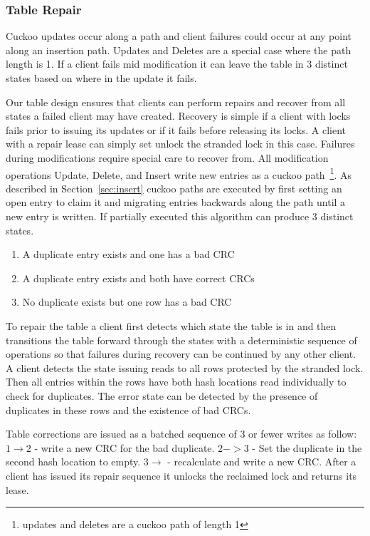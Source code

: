 \subsubsection{Table Repair} 
\label{sec:table-repair}

Cuckoo updates occur along a path
and client failures could occur at any point along an
insertion path. Updates and Deletes are a special case where
the path length is 1. If a client fails mid modification it
can leave the table in 3 distinct states based on where in
the update it fails. 

Our table design ensures that clients can perform repairs
and recover from all states a failed client may have
created. Recovery is simple if a client with locks fails
prior to issuing its updates or if it fails before releasing
its locks. A client with a repair lease can simply set
unlock the stranded lock in this case. Failures during
modifications require special care to recover from. All
modification operations Update, Delete, and Insert write new
entries as a cuckoo path~\footnote{updates and deletes are a
cuckoo path of length 1}. As described in
Section~\ref{sec:insert} cuckoo paths are executed by first
setting an open entry to claim it and migrating entries
backwards along the path until a new entry is written. If
partially executed this algorithm can produce 3 distinct
states.

\begin{enumerate}
    \item{A duplicate entry exists and one has a bad CRC}
    \item{A duplicate entry exists and both have correct CRCs} 
    \item{No duplicate exists but one row has a bad CRC}
\end{enumerate}

To repair the table a client first detects which state the
table is in and then transitions the table forward through
the states with a deterministic sequence of operations so
that failures during recovery can be continued by any other
client. A client detects the state issuing reads to all rows
protected by the stranded lock. Then all entries within the
rows have both hash locations read individually to check for
duplicates. The error state can be detected by the presence
of duplicates in these rows and the existence of bad CRCs.

Table corrections are issued as a batched sequence of 3 or
fewer writes as follow: $1 \rightarrow 2$ - write a new CRC
for the bad duplicate.  $2->3$ - Set the duplicate in the
second hash location to empty. $3\rightarrow$ - recalculate
and write a new CRC. After a client has issued its repair
sequence it unlocks the reclaimed lock and returns its
lease.


